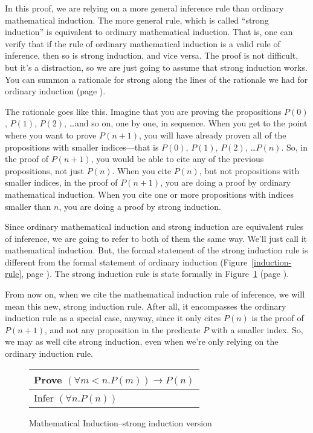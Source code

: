 In this proof, we are relying on a more general inference rule
than ordinary mathematical induction.
The more general rule, which is called ``strong induction''
is equivalent to ordinary mathematical induction.
That is, one can verify that if the rule of ordinary mathematical induction
is a valid rule of inference, then so is strong induction, and vice versa.
The proof is not difficult, but it's a distraction,
so we are just going to assume that strong induction works.
You can summon a rationale for strong along the lines
of the rationale we had for ordinary induction (page \pageref{induction-rationale}).

\label{strong-induction-rationale}
The rationale goes like this.
Imagine that you are proving the propositions
$P(0)$, $P(1)$, $P(2)$, \dots and so on,
one by one, in sequence.
When you get to the point where you want to prove $P(n+1)$,
you will have already proven all of the propositions
with smaller indices---that is
$P(0)$, $P(1)$, $P(2)$, \dots $P(n)$.
So, in the proof of $P(n+1)$, you would be able to
cite any of the previous propositions, not just $P(n)$.
When you cite $P(n)$, but not propositions with smaller indices,
in the proof of $P(n+1)$, you are doing a proof by ordinary mathematical induction.
When you cite one or more propositions with indices smaller than $n$,
you are doing a proof by strong induction.

Since ordinary mathematical induction and strong induction are
equivalent rules of inference, we are going to refer to both of
them the same way. We'll just call it mathematical induction.
But, the formal statement of the strong induction rule
is different from the formal statement of ordinary induction
(Figure~\ref{induction-rule}, page \pageref{induction-rule}).
The strong induction rule is state formally in
Figure~\ref{strong-induction-rule} (page \pageref{strong-induction-rule}).

From now on, when we cite the mathematical induction rule of inference,
we will mean this new, strong induction rule.
After all, it encompasses the ordinary induction rule
as a special case, anyway, since it only cites $P(n)$ is the proof
of $P(n+1)$, and not any proposition in the predicate $P$ with a smaller index.
So, we may as well cite strong induction, even when we're only relying
on the ordinary induction rule.

\begin{figure}
\begin{center}
\begin{tabular}{l}
Prove $(\forall m<n.P(m))\rightarrow P(n)$ \\
\hline
Infer $(\forall n.P(n))$
\end{tabular}
\end{center}
\caption{Mathematical Induction--strong induction version}
\label{strong-induction-rule}
\end{figure}

